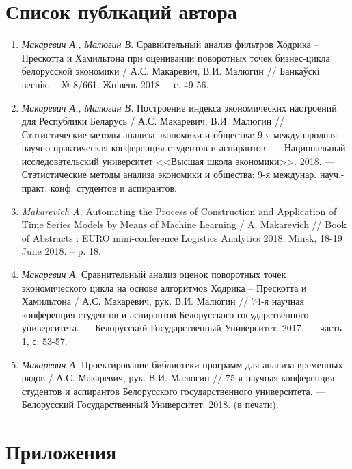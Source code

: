 \documentclass[a4paper,14pt]{extreport}
\begin{document}
	\chapter*{Список публкаций автора}
	\begin{enumerate}[label=A\arabic*.]
		\item \textit{Макаревич А., Малюгин В.} Сравнительный анализ фильтров Ходрика – Прескотта и Хамильтона при оценивании поворотных точек бизнес-цикла белорусской экономики / А.С. Макаревич, В.И. Малюгин // Банкаўскі веснік. – № 8/661. Жнівень 2018. – с. 49-56.
		
		\item \textit{Макаревич А., Малюгин В.} Построение индекса экономических настроений для Республики Беларусь / А.С. Макаревич, В.И. Малюгин // Статистические методы анализа экономики и общества: 9-я международная научно-практическая конференция студентов и аспирантов. — Национальный исследовательский университет <<Высшая школа экономики>>. 2018. — Статистические методы анализа экономики и общества: 9-я междунар. науч.-практ. конф. студентов и аспирантов.
		
		\item \textit{Makarevich A.} Automating the Process of Construction and Application of Time Series Models by Means of Machine Learning / A. Makarevich // Book of Abstracts : EURO mini-conference Logistics Analytics 2018, Minsk, 18-19 June 2018. – p. 18.
		
		\item \textit{Макаревич А.} Сравнительный анализ оценок поворотных точек экономического цикла на основе алгоритмов Ходрика – Прескотта и Хамильтона / А.С. Макаревич, рук. В.И. Малюгин // 74-я научная конференция студентов и аспирантов Белорусского государственного университета. — Белорусский Государственный Университет. 2017. — часть 1, с. 53-57.
		
		\item \textit{Макаревич А.} Проектирование библиотеки программ для анализа временных рядов / А.С. Макаревич, рук. В.И. Малюгин // 75-я научная конференция студентов и аспирантов Белорусского государственного университета. — Белорусский Государственный Университет. 2018. (в печати).
	\end{enumerate}
	
	
	\chapter*{Приложения}
	
\end{document}
